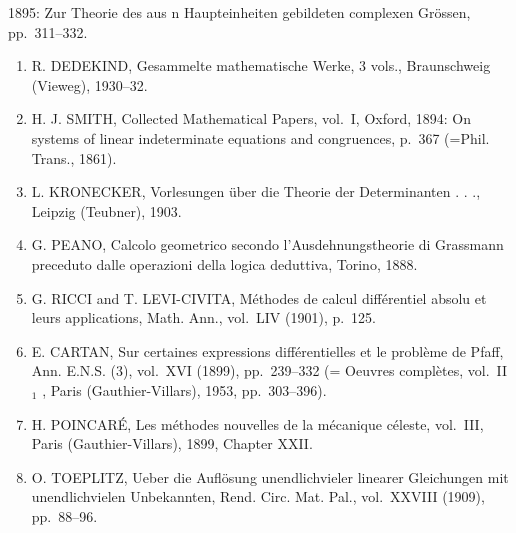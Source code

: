 1895: Zur Theorie des aus n Haupteinheiten gebildeten complexen Grössen, pp.~311--332.

\begin{enumerate}
\def\labelenumi{\arabic{enumi}.}
\setcounter{enumi}{23}
\item
  R. DEDEKIND, Gesammelte mathematische Werke, 3 vols., Braunschweig (Vieweg), 1930--32.
\item
  H. J. SMITH, Collected Mathematical Papers, vol.~I, Oxford, 1894: On systems of linear indeterminate equations and congruences, p.~367 (=Phil. Trans., 1861).
\item
  L. KRONECKER, Vorlesungen über die Theorie der Determinanten . . ., Leipzig (Teubner), 1903.
\item
  G. PEANO, Calcolo geometrico secondo l'Ausdehnungstheorie di Grassmann preceduto dalle operazioni della logica deduttiva, Torino, 1888.
\item
  G. RICCI and T. LEVI-CIVITA, Méthodes de calcul différentiel absolu et leurs applications, Math. Ann., vol.~LIV (1901), p.~125.
\item
  E. CARTAN, Sur certaines expressions différentielles et le problème de Pfaff, Ann. E.N.S. (3), vol.~XVI (1899), pp.~239--332 (= Oeuvres complètes, vol.~II \(_{1}\) , Paris (Gauthier-Villars), 1953, pp.~303--396).
\item
  H. POINCARÉ, Les méthodes nouvelles de la mécanique céleste, vol.~III, Paris (Gauthier-Villars), 1899, Chapter XXII.
\item
  O. TOEPLITZ, Ueber die Auflösung unendlichvieler linearer Gleichungen mit unendlichvielen Unbekannten, Rend. Circ. Mat. Pal., vol.~XXVIII (1909), pp.~88--96.
\end{enumerate}

